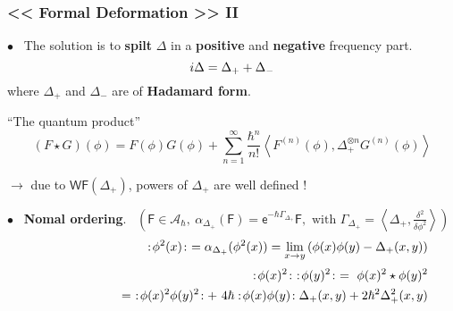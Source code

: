 \documentclass[9pt]{beamer}
\newcommand{\Smearip}[1]{\left\langle #1 \right\rangle} %
\newcommand{\E}{\mathsf{e}} %
\newcommand{\Wick}[1]{:\!{#1}\!:} %
\newcommand{\WF}{\mathsf{WF}} %
\newcommand{\Acal}{\mathcal{A}}
\newcommand{\Fsf}{\mathsf{F}}
\begin{document}
\begin{frame}

\frametitle{<< Formal Deformation >> II}

\vfill

$\bullet$ \ The solution is to \textbf{spilt} $\Delta$ in a \textbf{positive} and \textbf{negative} frequency part.
\vspace*{-10pt}
\begin{equation*}
i\Delta = \Delta_+ + \Delta_- 
\vspace*{-10pt}
\end{equation*}
\hspace*{8pt} where $\Delta_+$ and $\Delta_-$ are of \textbf{Hadamard form}.

\vfill 

\begin{block}{``The quantum product''}
\vspace*{-16pt}
\begin{equation*}
 (F \star G)(\phi) = F(\phi) G(\phi) + \sum_{n=1}^\infty \frac{\hbar^n}{n!} \Smearip{F^{(n)}(\phi), \Delta_+^{\otimes n} G^{(n)}(\phi)} 
\end{equation*}
\vspace*{-8pt}
\end{block}

$\to$ due to $\WF(\Delta_+)$, powers of $\Delta_+$ are well defined !

\vfill

$\bullet$ \ \textbf{Nomal ordering}. \ 
$\left( \Fsf \in \Acal_\hbar, \ \alpha_{\Delta_+}(\Fsf) = \E^{-\hbar \Gamma_{\Delta_+}} \Fsf, \mbox{ with } \Gamma_{\Delta_+} = \Smearip{\Delta_+,\frac{\delta^2}{\delta\phi^2}} \right)$ 
\begin{eqnarray*}
&& \hspace*{-6pt} \Wick{\phi^2(x)} \ = \alpha_{\Delta_+}(\phi^2(x)) = \underset{x\to y}{\lim} \left( \phi(x)\phi(y) - \Delta_+(x,y) \right) \\[2pt]
&& \hspace*{-6pt} \Wick{\phi(x)^2} \ \Wick{\phi(y)^2} \ = \ \phi(x)^2 \star \phi(y)^2 \\
&& \hspace*{58pt} = \ \Wick{\phi(x)^2 \phi(y)^2} + \ 4 \hbar \Wick{\phi(x) \phi(y)}  \Delta_+(x,y) + 2 \hbar^2 \Delta^2_+(x,y)
\end{eqnarray*}

\vfill

\end{frame}

\end{document}
